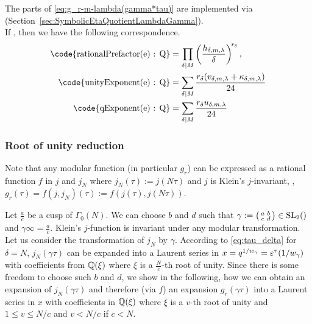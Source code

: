 \documentclass{article}
\begin{document}
The parts of \eqref{eq:g_r-m-lambda(gamma*tau)} are implemented via
\textcolor{blue}{}
(Section~\ref{sec:SymbolicEtaQuotientLambdaGamma}).
\\
If , then we have the
following correspondence.
\begin{align*}
  \text{\code{rationalPrefactor(e) : Q}}
  &=
    \divisorprod{M}
    \left(\frac{h_{\delta,m,\lambda}}{\delta}\right)^{\!r_\delta},
  \\
  \text{\code{unityExponent(e) : Q}}
  &=
    \divisorsum{M} \frac{r_\delta(v_{\delta,m,\lambda} + \kappa_{\delta,m,\lambda})}{24}
  \\
  \text{\code{qExponent(e) : Q}}
  &=
    \divisorsum{M} \frac{r_\delta u_{\delta,m,\lambda}}{24}
\end{align*}



\subsubsection{Root of unity reduction}

Note that any modular function (in particular $g_r$) can be expressed
as a rational function $f$ in $j$ and $j_N$ where
$j_N(\tau):=j(N\tau)$ and $j$ is Klein's $j$-invariant, \ie,
$g_r(\tau)=f(j, j_N)(\tau) := f(j(\tau), j(N\tau))$.

Let $\frac{a}{c}$ be a cusp of $\Gamma_0(N)$.
%
We can choose $b$ and $d$ such that
%
$\gamma := \bigl(
\begin{smallmatrix}
  a & b\\
  c & d
\end{smallmatrix}
\bigr) \in \SL2Z$ and $\gamma\infty=\frac{a}{c}$.
%
Klein's $j$-function is invariant under any modular transformation.
%
Let us consider the transformation of $j_N$ by $\gamma$.
%
According to \eqref{eq:tau_delta} for $\delta=N$, $j_N(\gamma\tau)$
can be expanded into a Laurent series in
$x=q^{1/w_\gamma}=\varepsilon^\tau\!\left(1/w_\gamma\right)$ with
coefficients from $\mathbb{Q}(\xi)$ where $\xi$ is a $\frac{N}{c}$-th root
of unity.
%
Since there is some freedom to choose such $b$ and $d$, we show in the
following, how we can obtain an expansion of $j_N(\gamma\tau)$ and
therefore (via $f$) an expansion $g_r(\gamma\tau)$ into a Laurent
series in $x$ with coefficients in $\mathbb{Q}(\xi)$ where $\xi$ is a
$v$-th root of unity and $1 \leq v \le N/c$ and $v<N/c$ if $c<N$.
\end{document}
